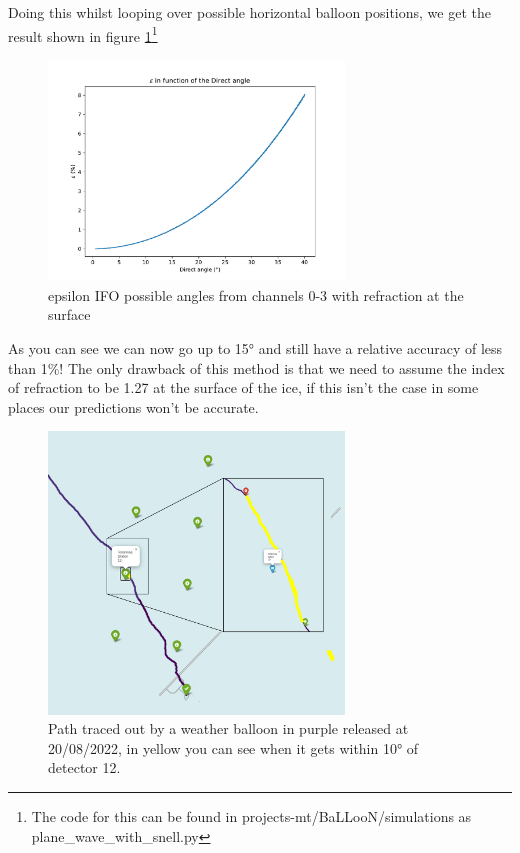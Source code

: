 \documentclass[11pt,a4paper,faculty=we,language=en,doctype=report]{cls/ugent-doc}
\begin{document}
Doing this whilst looping over possible horizontal balloon positions, we get
the result shown in figure \ref{fig:EpsilonIFODirectSnell}\footnote{The code
for this can be found in projects-mt/BaLLooN/simulations as
plane\_wave\_with\_snell.py}
\begin{figure}
	\centering
	\includegraphics[width=0.7\textwidth]{EpsilonIFODirectSnell.pdf}
	\caption{epsilon IFO possible angles from channels 0-3 with refraction at the surface}
	\label{fig:EpsilonIFODirectSnell}
\end{figure}
As you can see we can now go up to 15° and still have a relative accuracy of less than 1\%!  The
only drawback of this method is that we need to assume the index of refraction
to be 1.27 at the surface of the ice, if this isn't the case in some places our
predictions won't be accurate.

\begin{figure}
  \centering
	\includegraphics[width=0.7\textwidth]{BallonPathAllIllu.pdf}
  \caption{Path traced out by a weather balloon in purple released at 20/08/2022, in yellow you can see when it
  gets within 10° of detector 12.}
  \label{fig:ExampleBalloonPathCrossing12}
\end{figure}
\end{document}
